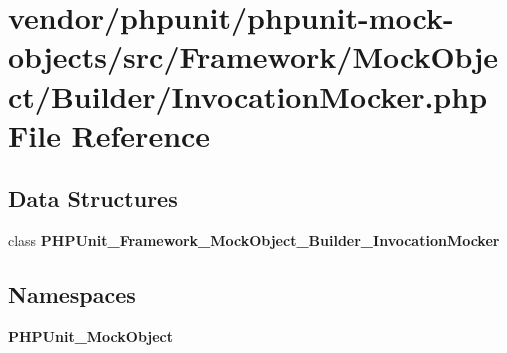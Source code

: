 \section{vendor/phpunit/phpunit-\/mock-\/objects/src/\+Framework/\+Mock\+Object/\+Builder/\+Invocation\+Mocker.php File Reference}
\label{_builder_2_invocation_mocker_8php}
\subsection*{Data Structures}
\begin{DoxyCompactItemize}
\item 
class {\bf P\+H\+P\+Unit\+\_\+\+Framework\+\_\+\+Mock\+Object\+\_\+\+Builder\+\_\+\+Invocation\+Mocker}
\end{DoxyCompactItemize}
\subsection*{Namespaces}
\begin{DoxyCompactItemize}
\item 
 {\bf P\+H\+P\+Unit\+\_\+\+Mock\+Object}
\end{DoxyCompactItemize}
